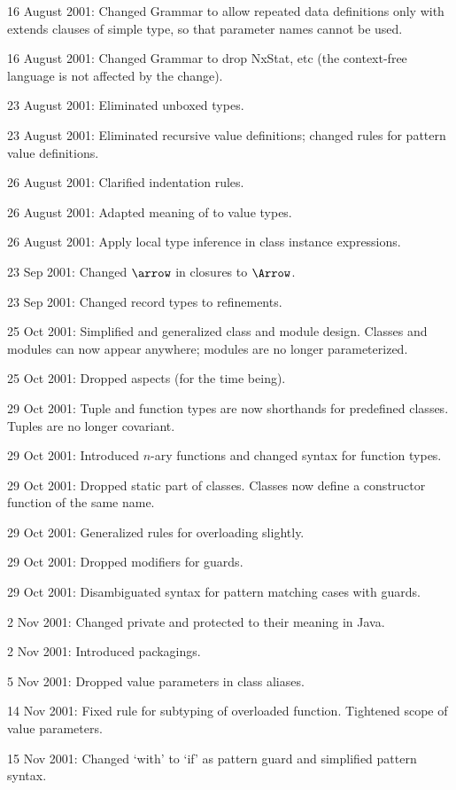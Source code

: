 \documentclass[11pt]{report}
\begin{document}
{16 August 2001: Changed Grammar to allow repeated data definitions
only with extends clauses of simple type, so that parameter names
cannot be used.

16 August 2001: Changed Grammar to drop NxStat, etc (the context-free language
is not affected by the change).

23 August 2001: Eliminated unboxed types.

23 August 2001: Eliminated recursive value definitions; changed rules
                for pattern value definitions.

26 August 2001: Clarified indentation rules.

26 August 2001: Adapted meaning of \verb@null@ to value types.

26 August 2001: Apply local type inference in class instance expressions.

23 Sep 2001: Changed $\arrow$ in closures to $\Arrow$.

23 Sep 2001: Changed record types to refinements.

25 Oct 2001: Simplified and generalized class and module
design. Classes and modules can now appear anywhere; modules are no
longer parameterized.

25 Oct 2001: Dropped aspects (for the time being).

29 Oct 2001:
  Tuple and function types are now shorthands for predefined
  classes. Tuples are no longer covariant.

29 Oct 2001:
  Introduced $n$-ary functions and changed syntax for function types.

29 Oct 2001:
  Dropped static part of classes. Classes now define a constructor
  function of the same name.

29 Oct 2001:
  Generalized rules for overloading slightly.

29 Oct 2001:
  Dropped modifiers for guards.

29 Oct 2001:
  Disambiguated syntax for pattern matching cases with guards.

2 Nov 2001: Changed private and protected to their meaning in Java.

2 Nov 2001: Introduced packagings.

5 Nov 2001: Dropped value parameters in class aliases.

14 Nov 2001: Fixed rule for subtyping of overloaded
function. Tightened scope of value parameters.

15 Nov 2001: Changed `with' to `if' as pattern guard and simplified
pattern syntax.

}
\end{document}
